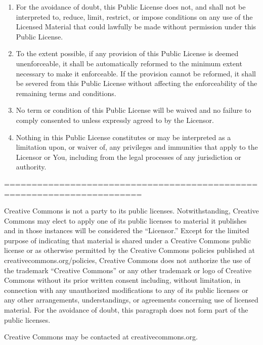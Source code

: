 \documentclass[]{article}
\begin{document}
\begin{enumerate}
\def\labelenumi{\alph{enumi}.}
\item
  For the avoidance of doubt, this Public License does not, and shall
  not be interpreted to, reduce, limit, restrict, or impose conditions
  on any use of the Licensed Material that could lawfully be made
  without permission under this Public License.
\item
  To the extent possible, if any provision of this Public License is
  deemed unenforceable, it shall be automatically reformed to the
  minimum extent necessary to make it enforceable. If the provision
  cannot be reformed, it shall be severed from this Public License
  without affecting the enforceability of the remaining terms and
  conditions.
\item
  No term or condition of this Public License will be waived and no
  failure to comply consented to unless expressly agreed to by the
  Licensor.
\item
  Nothing in this Public License constitutes or may be interpreted as a
  limitation upon, or waiver of, any privileges and immunities that
  apply to the Licensor or You, including from the legal processes of
  any jurisdiction or authority.
\end{enumerate}

=======================================================================

Creative Commons is not a party to its public licenses. Notwithstanding,
Creative Commons may elect to apply one of its public licenses to
material it publishes and in those instances will be considered the
``Licensor.'' Except for the limited purpose of indicating that material
is shared under a Creative Commons public license or as otherwise
permitted by the Creative Commons policies published at
creativecommons.org/policies, Creative Commons does not authorize the
use of the trademark ``Creative Commons'' or any other trademark or logo
of Creative Commons without its prior written consent including, without
limitation, in connection with any unauthorized modifications to any of
its public licenses or any other arrangements, understandings, or
agreements concerning use of licensed material. For the avoidance of
doubt, this paragraph does not form part of the public licenses.

Creative Commons may be contacted at creativecommons.org.
\end{document}
